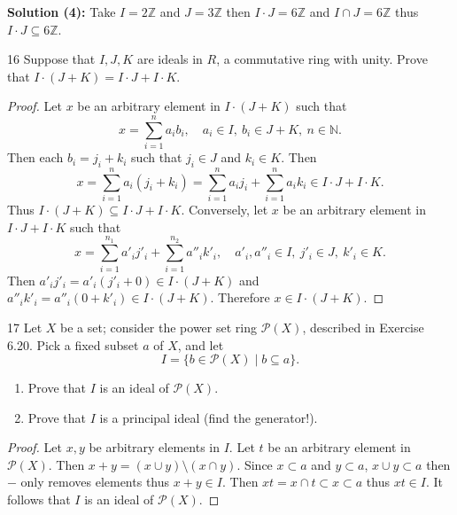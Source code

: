 \textbf{Solution (4): }
Take $I = 2 \mathbb{Z}$ and $J = 3 \mathbb{Z}$ then $I \cdot J = 6 \mathbb{Z}$
    and $I \cap J = 6 \mathbb{Z}$ thus $I \cdot J \subseteq 6 \mathbb{Z}$.

\begin{problem}{16}
    Suppose that $I, J, K$ are ideals in $R$, a commutative ring with unity.
    Prove that $I \cdot (J + K) = I \cdot J + I \cdot K$.
\end{problem}
\solved

\begin{proof}
    Let $x$ be an arbitrary element in $I \cdot (J + K)$ such that 
    \[
        x = \sum_{i = 1}^{n} a_i b_i, \quad a_i \in I, \ b_i \in J + K, \ n \in \mathbb{N}.
    \]
    Then each $b_i = j_i + k_i$ such that $j_i \in J$ and $k_i \in K$. Then
    \[
        x = \sum_{i = 1}^{n} a_i (j_i + k_i) = \sum_{i = 1}^{n} a_i j_i + \sum_{i = 1}^{n} a_i k_i \in I \cdot J + I \cdot K.
    \]
    Thus $I \cdot (J + K) \subseteq I \cdot J + I \cdot K$.
    Conversely, let $x$ be an arbitrary element in $I \cdot J + I \cdot K$ such that 
    \[
        x = \sum_{i = 1}^{n_1} a'_i j'_i + \sum_{i = 1}^{n_2} a''_i k'_i, \quad 
        a'_i, a''_i \in I, \ j'_i \in J, \ k'_i \in K.
    \]
    Then $a'_i j'_i = a'_i (j'_i + 0) \in I \cdot (J + K)$ and $a''_i k'_i = a''_i (0 + k'_i) \in I \cdot (J + K)$.  
    Therefore $x \in I \cdot (J + K)$.
\end{proof}

\begin{problem}{17}
    Let $X$ be a set; consider the power set ring $\mathcal{P}(X)$, described in
        Exercise 6.20. Pick a fixed subset $a$ of $X$, and let 
        \[I = \{b \in \mathcal{P}(X) \mid b \subseteq a\}.\]
    \begin{enumerate}
        \item Prove that $I$ is an ideal of $\mathcal{P}(X)$.
        \item Prove that $I$ is a principal ideal (find the generator!).
    \end{enumerate}
\end{problem}
\solved

\begin{proof}
    Let $x, y$ be arbitrary elements in $I$.
    Let $t$ be an arbitrary element in $\mathcal{P}(X)$.
    Then $x + y = (x \cup y) \setminus (x \cap y)$.
    Since $x \subset a$ and $y \subset a$, $x \cup y \subset a$ then $-$
        only removes elements thus $x + y \in I$.
    Then $xt = x \cap t \subset x \subset a$ thus $xt \in I$.
    It follows that $I$ is an ideal of $\mathcal{P}(X)$.
\end{proof}

